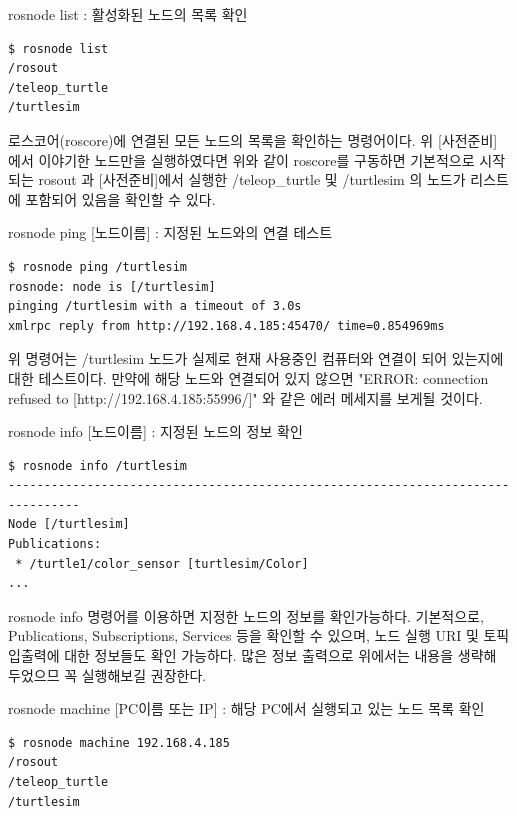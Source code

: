 \setcounter{num}{0}

\vspace{\baselineskip}
\noindent
{}\circled{\thenum} rosnode list : 활성화된 노드의 목록 확인
\begin{lstlisting}[language=ROS]
$ rosnode list
/rosout
/teleop_turtle
/turtlesim
\end{lstlisting}

\vspace{\baselineskip}
\noindent
로스코어(roscore)에 연결된 모든 노드의 목록을 확인하는 명령어이다. 위 [사전준비] 에서 이야기한 노드만을 실행하였다면 위와 같이 roscore를 구동하면 기본적으로 시작되는 rosout 과 [사전준비]에서 실행한 /teleop\_turtle 및 /turtlesim 의 노드가 리스트에 포함되어 있음을 확인할 수 있다.

\vspace{\baselineskip}
\noindent
{}\circled{\thenum} rosnode ping [노드이름] : 지정된 노드와의 연결 테스트
\begin{lstlisting}[language=ROS]
$ rosnode ping /turtlesim
rosnode: node is [/turtlesim]
pinging /turtlesim with a timeout of 3.0s
xmlrpc reply from http://192.168.4.185:45470/ time=0.854969ms
\end{lstlisting}

\vspace{\baselineskip}
\noindent
위 명령어는 /turtlesim 노드가 실제로 현재 사용중인 컴퓨터와 연결이 되어 있는지에 대한 테스트이다. 만약에 해당 노드와 연결되어 있지 않으면 "ERROR: connection refused to [http://192.168.4.185:55996/]" 와 같은 에러 메세지를 보게될 것이다.

\vspace{\baselineskip}
\noindent
{}\circled{\thenum} rosnode info [노드이름] : 지정된 노드의 정보 확인
\begin{lstlisting}[language=ROS]
$ rosnode info /turtlesim 
--------------------------------------------------------------------------------
Node [/turtlesim]
Publications: 
 * /turtle1/color_sensor [turtlesim/Color]
...
\end{lstlisting}

\vspace{\baselineskip}
\noindent
rosnode info 명령어를 이용하면 지정한 노드의 정보를 확인가능하다. 기본적으로, Publications, Subscriptions, Services 등을 확인할 수 있으며, 노드 실행 URI 및 토픽 입출력에 대한 정보들도 확인 가능하다. 많은 정보 출력으로 위에서는 내용을 생략해 두었으므 꼭 실행해보길 권장한다.

\vspace{\baselineskip}
\noindent
{}\circled{\thenum} rosnode machine [PC이름 또는 IP] : 해당 PC에서 실행되고 있는 노드 목록 확인
\begin{lstlisting}[language=ROS]
$ rosnode machine 192.168.4.185
/rosout
/teleop_turtle
/turtlesim
\end{lstlisting}

